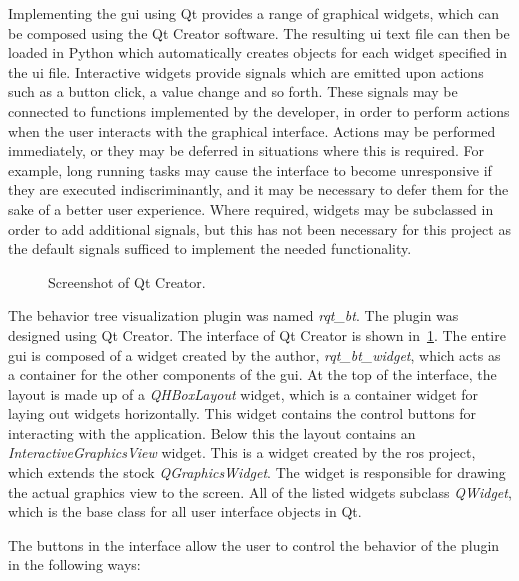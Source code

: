 \documentclass[\rootfolder/main.tex]{subfiles}
\begin{document}
Implementing the \acrshort{gui} using Qt provides a range of graphical widgets, which can be composed using the Qt Creator software.
The resulting \acrshort{ui} text file can then be loaded in Python which automatically creates objects for each widget specified in the \acrshort{ui} file.
Interactive widgets provide signals which are emitted upon actions such as a button click, a value change and so forth.
These signals may be connected to functions implemented by the developer, in order to perform actions when the user interacts with the graphical interface.
Actions may be performed immediately, or they may be deferred in situations where this is required.
For example, long running tasks may cause the interface to become unresponsive if they are executed indiscriminantly, and it may be necessary to defer them for the sake of a better user experience.
Where required, widgets may be subclassed in order to add additional signals, but this has not been necessary for this project as the default signals sufficed to implement the needed functionality.

\begin{figure}[ht]
    \caption{Screenshot of Qt Creator.}
    \label{fig:qt-creator}
\end{figure}

The behavior tree visualization plugin was named \emph{rqt\_bt}.
The plugin was designed using Qt Creator.
The interface of Qt Creator is shown in~\cref{fig:qt-creator}.
The entire \acrshort{gui} is composed of a widget created by the author, \emph{rqt\_bt\_widget}, which acts as a container for the other components of the \acrshort{gui}.
At the top of the interface, the layout is made up of a \emph{QHBoxLayout} widget, which is a container widget for laying out widgets horizontally.
This widget contains the control buttons for interacting with the application.
Below this the layout contains an \emph{InteractiveGraphicsView} widget.
This is a widget created by the \acrshort{ros} project, which extends the stock \emph{QGraphicsWidget}.
The widget is responsible for drawing the actual graphics view to the screen.
All of the listed widgets subclass \emph{QWidget}, which is the base class for all user interface objects in Qt.

The buttons in the interface allow the user to control the behavior of the plugin in the following ways:
\end{document}
